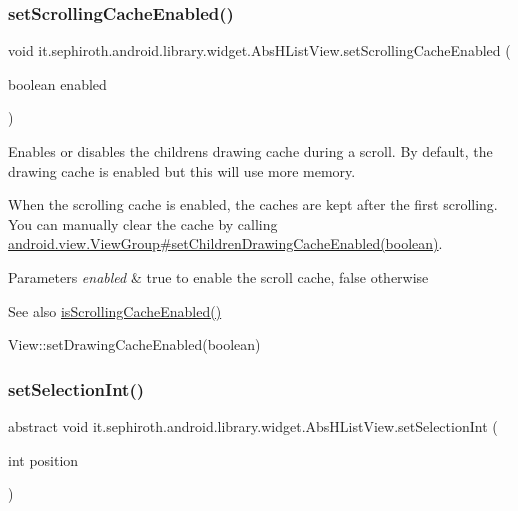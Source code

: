 \subsubsection{\texorpdfstring{set\+Scrolling\+Cache\+Enabled()}{setScrollingCacheEnabled()}}
{\footnotesize\ttfamily void it.\+sephiroth.\+android.\+library.\+widget.\+Abs\+H\+List\+View.\+set\+Scrolling\+Cache\+Enabled (\begin{DoxyParamCaption}\item[{boolean}]{enabled }\end{DoxyParamCaption})}

Enables or disables the children\textquotesingle{}s drawing cache during a scroll. By default, the drawing cache is enabled but this will use more memory.

When the scrolling cache is enabled, the caches are kept after the first scrolling. You can manually clear the cache by calling \hyperlink{}{android.\+view.\+View\+Group\#set\+Children\+Drawing\+Cache\+Enabled(boolean)}.


\begin{DoxyParams}{Parameters}
{\em enabled} & true to enable the scroll cache, false otherwise\\
\hline
\end{DoxyParams}
\begin{DoxySeeAlso}{See also}
\hyperlink{classit_1_1sephiroth_1_1android_1_1library_1_1widget_1_1_abs_h_list_view_afdbd5760313bd2ac23b77d93955952f0}{is\+Scrolling\+Cache\+Enabled()} 

View\+::set\+Drawing\+Cache\+Enabled(boolean) 
\end{DoxySeeAlso}
\mbox{\label{classit_1_1sephiroth_1_1android_1_1library_1_1widget_1_1_abs_h_list_view_abf34673d056f140b5fef14185f0a5cfb}} 
\subsubsection{\texorpdfstring{set\+Selection\+Int()}{setSelectionInt()}}
{\footnotesize\ttfamily abstract void it.\+sephiroth.\+android.\+library.\+widget.\+Abs\+H\+List\+View.\+set\+Selection\+Int (\begin{DoxyParamCaption}\item[{int}]{position }\end{DoxyParamCaption})\hspace{0.3cm}{\ttfamily [abstract]}}

